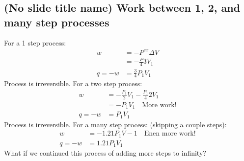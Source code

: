 \documentclass{article}  %
\begin{document}
\subsection*{(No slide title name) Work between 1, 2, and many step processes}
For a 1 step process:
\begin{equation*}
    \begin{aligned}
        w &= -P^{ex}\Delta V \\
        &= -\frac{P}{4} 3V_1 \\
        q = -w &= \frac{3}{4}P_1 V_1
    \end{aligned}
\end{equation*}
Process is irreversible.
For a two step process:
\begin{equation*}
    \begin{aligned}
        w &= -\frac{P_1}{2}V_1 - \frac{P_1}{4}2 V_1 \\
        &= -P_1V_1 \quad \text{More work!} \\
        q = -w &= P_1V_1
    \end{aligned}
\end{equation*}
Process is irreversible.
For a many step process: (skipping a couple steps):
\begin{equation*}
    \begin{aligned}
        w &= -1.21 P_1V-1 \quad \text{Enen more work!} \\
        q = -w &= 1.21 P_1V_1
    \end{aligned}
\end{equation*}
What if we continued this process of adding more steps to infinity?
\end{document}
